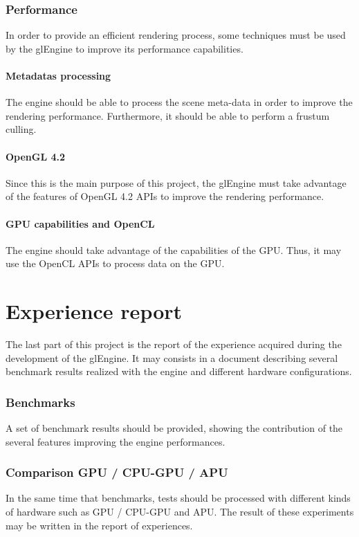 \documentclass [a4 paper,11pt]{article}
\begin{document}
\section{Performance}
In order to provide an efficient rendering process, some techniques must be used by the glEngine to improve its performance capabilities.

\subsection{Metadatas processing}
The engine should be able to process the scene meta-data in order to improve the rendering performance. Furthermore, it should be able to perform a frustum culling.

\subsection{OpenGL 4.2}
Since this is the main purpose of this project, the glEngine must take advantage of the features of OpenGL 4.2 APIs to improve the rendering performance.

\subsection{GPU capabilities and OpenCL}
The engine should take advantage of the capabilities of the GPU. Thus, it may use the OpenCL APIs to process data on the GPU.

\part{Experience report}
The last part of this project is the report of the experience acquired during the development of the glEngine. It may consists in a document describing several benchmark results realized with the engine and different hardware configurations.

\section{Benchmarks}
A set of benchmark results should be provided, showing the contribution of the several features improving the engine performances.

\section{Comparison GPU / CPU-GPU / APU}
In the same time that benchmarks, tests should be processed with different kinds of hardware such as GPU / CPU-GPU and APU. The result of these experiments may be written in the report of experiences.
\end{document}

